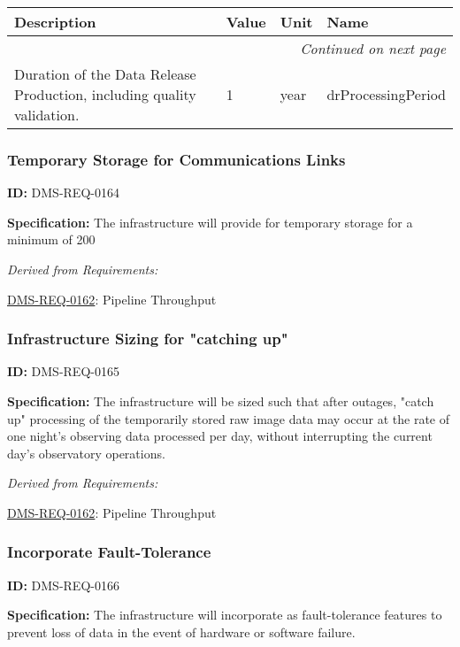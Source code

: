 \documentclass[SE,toc,lsstdraft]{lsstdoc}
\makeatletter
\newcommand{\paramname}[1]{\hspace{0pt}#1}
\newcommand{\unitname}[1]{\hspace{0pt}#1}
\newenvironment{parameters}[0]{%
\setlength\LTleft{0pt}
\setlength\LTright{\fill}
\begin{small}
\begin{longtable}[]{|p{0.5\textwidth}|l|p{0.6in}|p{1.74in}@{}|}

\hline \textbf{Description} & \textbf{Value} & \textbf{Unit} & \textbf{Name} \\ \hline
\endhead

\hline \multicolumn{4}{r}{\emph{Continued on next page}} \\
\endfoot

\hline\hline
\endlastfoot
}{%
\hline
\end{longtable}
\end{small}
}
\makeatother
\begin{document}
\begin{parameters}
Duration of the Data Release Production, including quality validation.
&
1
&
\unitname{%
year
}
&
\paramname{%
drProcessingPeriod
} \\\hline
\end{parameters}




\subsubsection{Temporary Storage for Communications Links}

\label{DMS-REQ-0164}
\textbf{ID:} DMS-REQ-0164

\textbf{Specification: }The infrastructure will provide for temporary storage for a minimum of 200%






\emph{Derived from Requirements:}

\hyperref[DMS-REQ-0162]{DMS-REQ-0162}:
Pipeline Throughput \newline


\subsubsection{Infrastructure Sizing for "catching up"}

\label{DMS-REQ-0165}
\textbf{ID:} DMS-REQ-0165

\textbf{Specification: }The infrastructure will be sized such that after outages, "catch up" processing of the temporarily stored raw image data may occur at the rate of one night’s observing data processed per day, without interrupting the current day's observatory operations.






\emph{Derived from Requirements:}

\hyperref[DMS-REQ-0162]{DMS-REQ-0162}:
Pipeline Throughput \newline


\subsubsection{Incorporate Fault-Tolerance}

\label{DMS-REQ-0166}
\textbf{ID:} DMS-REQ-0166

\textbf{Specification: }The infrastructure will incorporate as fault-tolerance features to prevent loss of data in the event of hardware or software failure.
\end{document}
